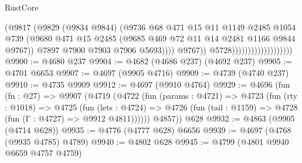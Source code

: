 \begin{lexlean}{RustCore}
\begin{coremodule}
                                                (@9817
                                                  (@9829
                                                    (@9834 @9844)
                                                    (@9736
                                                      @68
                                                      @471
                                                      @15
                                                      @11
                                                      @1149
                                                      @2485
                                                      @1054
                                                      @739
                                                      (@9680
                                                        @471
                                                        @15
                                                        @2485
                                                        (@9685
                                                          @469
                                                          @72
                                                          @11
                                                          @14
                                                          @2481
                                                          @1166
                                                          @9844
                                                          @9767))
                                                      @7897
                                                      @7900
                                                      @7903
                                                      @7906
                                                      @5693))))
                                              @9767))
                                          @5728)))))))))))))))))))
@9900 := @4680 @237
@9904 := @4682 (@4686 @237) (@4692 @237)
@9905 := @4701 @6653
@9907 := @4697 (@9905 @4716)
@9909 := @4739 (@4740 @237)
@9910 := @4735 @9909
@9912 := @4697 (@9910 @4764)
@9929 := @4696
    (fun (fn : @27) =>
    @9907
      (@4719
        (@4722
          (fun (params : @4721) =>
          @4723
            (fun (rty : @1018) =>
            @4725
              (fun (lets : @4724) =>
              @4726 (fun (tail : @1159) => @4728 (fun (Γ : @4727) => @9912 @4811))))))
        @4857))
    @628
@9932 := @4863 (@9905 (@4714 @628))
@9935 := @4776 (@4777 @628) @6656
@9939 := @4697 (@4768 (@9935 @4785) @4789)
@9940 := @4802 @628
@9945 := @4799 (@4801 @9940 @6659 @4757 @4759)

\end{coremodule}
\end{lexlean}
